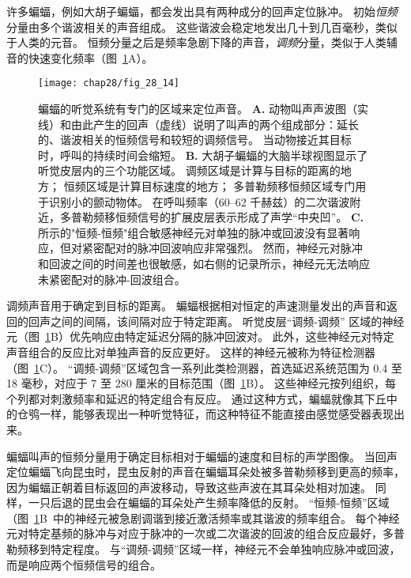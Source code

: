 许多蝙蝠，例如大胡子蝙蝠，都会发出具有两种成分的回声定位脉冲\cite{suga1983specificity,suga1984neural}。
初始\emph{恒频}分量由多个谐波相关的声音组成。 %
这些谐波会稳定地发出几十到几百毫秒，类似于人类的元音。
恒频分量之后是频率急剧下降的声音，\textit{调频}分量，类似于人类辅音的快速变化频率（图~\ref{fig:28_14}A）。


\begin{figure}[htbp]
	\centering
	\texttt{[image: chap28/fig\_28\_14]}
	\caption{蝙蝠的听觉系统有专门的区域来定位声音。
		\textbf{A.} 动物叫声声波图（实线）和由此产生的回声（虚线）说明了叫声的两个组成部分：延长的、谐波相关的恒频信号和较短的调频信号。 
		当动物接近其目标时，呼叫的持续时间会缩短\cite{suga1984neural}。
		\textbf{B.} 大胡子蝙蝠的大脑半球视图显示了听觉皮层内的三个功能区域。
		调频区域是计算与目标的距离的地方；
		恒频区域是计算目标速度的地方；
		多普勒频移恒频区域专门用于识别小的颤动物体。
		在呼叫频率（60–62 千赫兹）的二次谐波附近，多普勒频移恒频信号的扩展皮层表示形成了声学“中央凹”\cite{suga1984neural}。
		\textbf{C.} 所示的"恒频-恒频"组合敏感神经元对单独的脉冲或回波没有显著响应，但对紧密配对的脉冲回波响应非常强烈。
		然而，神经元对脉冲和回波之间的时间差也很敏感，如右侧的记录所示，神经元无法响应未紧密配对的脉冲-回波组合\cite{suga1983specificity}。}
	\label{fig:28_14}
\end{figure}


调频声音用于确定到目标的距离。
蝙蝠根据相对恒定的声速测量发出的声音和返回的回声之间的间隔，该间隔对应于特定距离。
听觉皮层“调频-调频” 区域的神经元（图~\ref{fig:28_14}B）优先响应由特定延迟分隔的脉冲回波对。
此外，这些神经元对特定声音组合的反应比对单独声音的反应更好。
这样的神经元被称为特征检测器（图~\ref{fig:28_14}C）。
“调频-调频”区域包含一系列此类检测器，首选延迟系统范围为 0.4 至 18 毫秒，对应于 7 至 280 厘米的目标范围（图~\ref{fig:28_14}B）。
这些神经元按列组织，每个列都对刺激频率和延迟的特定组合有反应。
通过这种方式，蝙蝠就像其下丘中的仓鸮一样，能够表现出一种听觉特征，而这种特征不能直接由感觉感受器表现出来。


蝙蝠叫声的恒频分量用于确定目标相对于蝙蝠的速度和目标的声学图像。
当回声定位蝙蝠飞向昆虫时，昆虫反射的声音在蝙蝠耳朵处被多普勒频移到更高的频率，因为蝙蝠正朝着目标返回的声波移动，导致这些声波在其耳朵处相对加速。
同样，一只后退的昆虫会在蝙蝠的耳朵处产生频率降低的反射。
“恒频-恒频”区域（图~\ref{fig:28_14}B~中的神经元被急剧调谐到接近激活频率或其谐波的频率组合。
每个神经元对特定基频的脉冲与对应于脉冲的一次或二次谐波的回波的组合反应最好，多普勒频移到特定程度。
与“调频-调频”区域一样，神经元不会单独响应脉冲或回波，而是响应两个恒频信号的组合。


